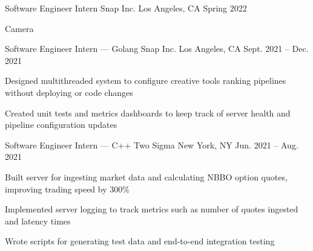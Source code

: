 \documentclass[12pt, letterpaper]{awesome-cv}
\begin{document}
\makecvheader
\begin{cventries}
  \cventry
    {Sof\/tware Engineer Intern} %
    {Snap Inc.} %
    {Los Angeles, CA} %
    {Spring 2022} %
    {
      \begin{cvitems} %
        \item {Camera}
      \end{cvitems}
    }

  \cventry
    {Sof\/tware Engineer Intern — Golang} %
    {Snap Inc.} %
    {Los Angeles, CA} %
    {Sept. 2021 -- Dec. 2021} %
    {
      \begin{cvitems} %
        \item {Designed multithreaded system to configure creative tools ranking pipelines without deploying or code changes}
        \item {Created unit tests and metrics dashboards to keep track of server health and pipeline configuration updates}
      \end{cvitems}
    }

  \cventry
    {Sof\/tware Engineer Intern — C++} %
    {Two Sigma} %
    {New York, NY} %
    {Jun. 2021 -- Aug. 2021} %
    {
      \begin{cvitems} %
        \item {Built server for ingesting market data and calculating NBBO option quotes, improving trading speed by 300\%}
        \item {Implemented server logging to track metrics such as number of quotes ingested and latency times}
        \item {Wrote scripts for generating test data and end-to-end integration testing}
      \end{cvitems}
    }


\end{cventries}
\end{document}
